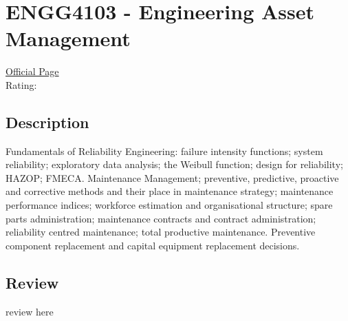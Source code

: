 \hypertarget{ENGG4103}{\section{ENGG4103 - Engineering Asset Management}}

\large
\textcolor{turbo_purple}{\href{https://my.uq.edu.au/programs-courses/course.html?course_code=ENGG4103}{Official Page}} \\
Rating: \cstar\cstar\cstar\cstar\ostar

\normalsize
\subsection*{Description}
Fundamentals of Reliability Engineering: failure intensity functions; system reliability; exploratory data analysis; the Weibull function; design for reliability; HAZOP; FMECA.
Maintenance Management; preventive, predictive, proactive and corrective methods and their place in maintenance strategy; maintenance performance indices; workforce estimation and organisational structure; spare parts administration; maintenance contracts and contract administration; reliability centred maintenance; total productive maintenance.
Preventive component replacement and capital equipment replacement decisions.

\subsection*{Review}
review here
